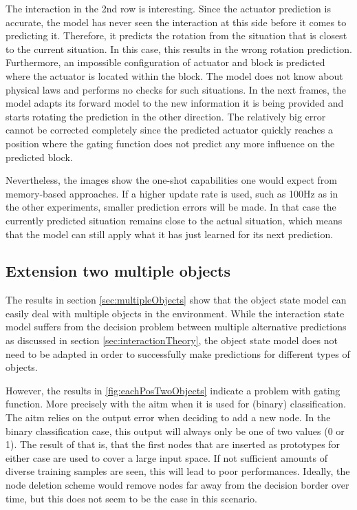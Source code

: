 The interaction in the 2nd row is interesting. Since the actuator prediction is accurate, the model has never seen the interaction at this side before it comes to predicting it. Therefore, it predicts the rotation from the situation that is closest to the current situation. In this case, this results in the wrong rotation prediction.
Furthermore, an impossible configuration of actuator and block is predicted where the actuator is located within the block. The model does not know about physical laws and performs no checks for such situations.
In the next frames, the model adapts its forward model to the new information it is being provided and starts rotating the prediction in the other direction. The relatively big error cannot be corrected completely since the predicted actuator quickly reaches a position where the gating function does not predict any more influence on the predicted block. 

Nevertheless, the images show the one-shot capabilities one would expect from memory-based approaches. If a higher update rate is used, such as 100Hz as in the other experiments, smaller prediction errors will be made. In that case the currently predicted situation remains close to the actual situation, which means that the model can still apply what it has just learned for its next prediction.


\subsection{Extension two multiple objects}

The results in section \ref{sec:multipleObjects} show that the object state model can easily deal with multiple objects in the environment. While the interaction state model suffers from the decision problem between multiple alternative predictions as discussed in section \ref{sec:interactionTheory}, the object state model does not need to be adapted in order to successfully make predictions for different types of objects. 

However, the results in \ref{fig:eachPosTwoObjects} indicate a problem with gating function. More precisely with the \gls{aitm} when it is used for (binary) classification. The \gls{aitm} relies on the output error when deciding to add a new node. In the binary classification case, this output will always only be one of two values (0 or 1). The result of that is, that the first nodes that are inserted as prototypes for either case are used to cover a large input space. If not sufficient amounts of diverse training samples are seen, this will lead to poor performances. Ideally, the node deletion scheme would remove nodes far away from the decision border over time, but this does not seem to be the case in this scenario.

